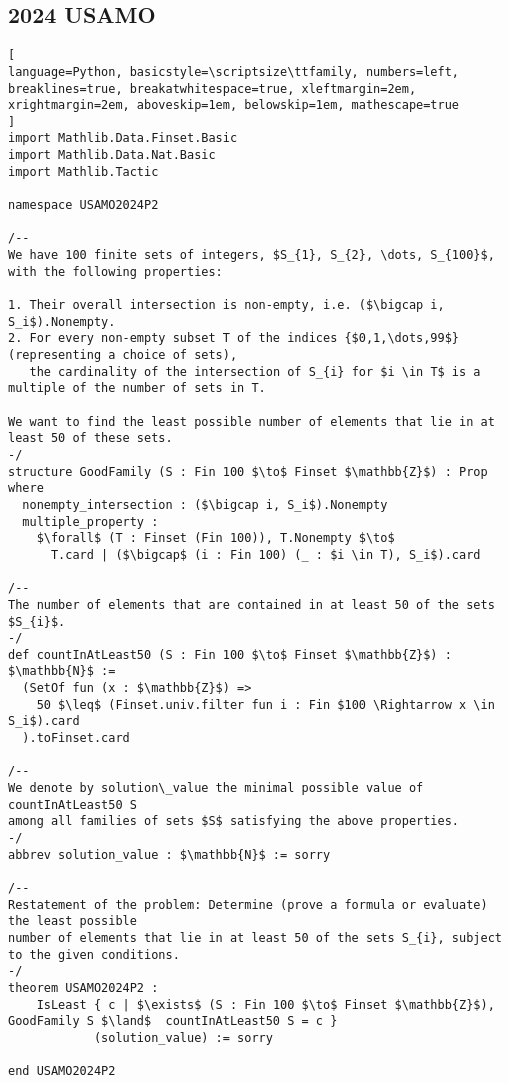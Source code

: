 \subsection*{2024 USAMO}
\begin{tcolorbox}[enhanced, breakable, rounded corners,
    colback=green!5!white, colframe=green!75!black,
    colbacktitle=green!85!black, fonttitle=\bfseries, coltitle=white, title=Lean Theorem for 2024 USAMO Problem 2]
\setlength{\parskip}{1em}
\begin{lstlisting}[
language=Python, basicstyle=\scriptsize\ttfamily, numbers=left, breaklines=true, breakatwhitespace=true, xleftmargin=2em, xrightmargin=2em, aboveskip=1em, belowskip=1em, mathescape=true
]
import Mathlib.Data.Finset.Basic
import Mathlib.Data.Nat.Basic
import Mathlib.Tactic

namespace USAMO2024P2

/--
We have 100 finite sets of integers, $S_{1}, S_{2}, \dots, S_{100}$, with the following properties:

1. Their overall intersection is non-empty, i.e. ($\bigcap i, S_i$).Nonempty.
2. For every non-empty subset T of the indices {$0,1,\dots,99$} (representing a choice of sets),
   the cardinality of the intersection of S_{i} for $i \in T$ is a multiple of the number of sets in T.

We want to find the least possible number of elements that lie in at least 50 of these sets.
-/
structure GoodFamily (S : Fin 100 $\to$ Finset $\mathbb{Z}$) : Prop where
  nonempty_intersection : ($\bigcap i, S_i$).Nonempty
  multiple_property :
    $\forall$ (T : Finset (Fin 100)), T.Nonempty $\to$
      T.card | ($\bigcap$ (i : Fin 100) (_ : $i \in T), S_i$).card

/--
The number of elements that are contained in at least 50 of the sets $S_{i}$.
-/
def countInAtLeast50 (S : Fin 100 $\to$ Finset $\mathbb{Z}$) : $\mathbb{N}$ :=
  (SetOf fun (x : $\mathbb{Z}$) =>
    50 $\leq$ (Finset.univ.filter fun i : Fin $100 \Rightarrow x \in S_i$).card
  ).toFinset.card

/--
We denote by solution\_value the minimal possible value of countInAtLeast50 S
among all families of sets $S$ satisfying the above properties.
-/
abbrev solution_value : $\mathbb{N}$ := sorry

/--
Restatement of the problem: Determine (prove a formula or evaluate) the least possible
number of elements that lie in at least 50 of the sets S_{i}, subject to the given conditions.
-/
theorem USAMO2024P2 :
    IsLeast { c | $\exists$ (S : Fin 100 $\to$ Finset $\mathbb{Z}$), GoodFamily S $\land$  countInAtLeast50 S = c }
            (solution_value) := sorry

end USAMO2024P2
\end{lstlisting}
\end{tcolorbox}


